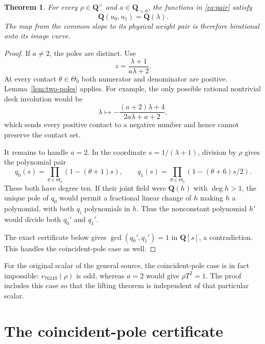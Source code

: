 \documentclass[11pt,a4paper]{article}
\newcommand{\Q}{\mathbf Q}
\newtheorem{theorem}{Theorem}
\begin{document}
\begin{theorem}\label{thm:birational}
For every $\rho\in\Q^\times$ and $a\in\Q_{>0}$,
the functions in \eqref{eq:pair} satisfy
\[
                       \Q(u_0,u_1)=\Q(\lambda).
\]
The map from the common slope to its physical weight pair is
therefore birational onto its image curve.
\end{theorem}
\begin{proof}
If $a\ne2$, the poles are distinct. Use
\[
                         z=\frac{\lambda+1}{a\lambda+2}.
\]
At every contact $\theta\in\Theta_0$ both numerator and
denominator are positive. Lemma~\ref{lem:two-poles} applies.
For example, the only possible rational nontrivial deck involution
would be
\[
 \lambda\longmapsto
 -\frac{(a+2)\lambda+4}{2a\lambda+a+2},
\]
which sends every positive contact to a negative number and hence
cannot preserve the contact set.

It remains to handle $a=2$. In the coordinate $s=1/(\lambda+1)$,
division by $\rho$ gives the polynomial pair
\[
 q_0(s)=\prod_{\theta\in\Theta_0}(1-(\theta+1)s),\qquad
 q_1(s)=\prod_{\theta\in\Theta_0}(1-(\theta+6)s/2).
\]
These both have degree ten. If their joint field were $\Q(h)$
with $\deg h>1$, the unique pole of $q_0$ would permit a
fractional linear change of $h$ making $h$ a polynomial, with
both $q_i$ polynomials in $h$. Thus the nonconstant polynomial
$h'$ would divide both $q_0'$ and $q_1'$.

The exact certificate below gives $\gcd(q_0',q_1')=1$ in
$\Q[s]$, a contradiction. This handles the coincident-pole
case as well.
\end{proof}

For the original scalar of the general source, the coincident-pole
case is in fact impossible: $v_{76249}(\rho)$ is odd, whereas
$a=2$ would give $\rho T^2=1$. The proof includes this case so
that the lifting theorem is independent of that particular scalar.

\section{The coincident-pole certificate}
\end{document}
